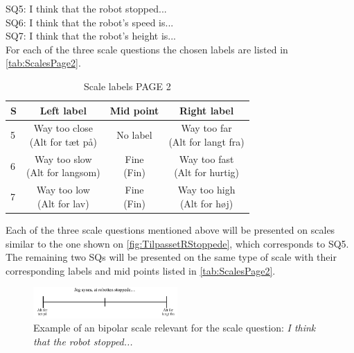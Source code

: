 \noindent
% 
SQ5: I think that the robot stopped... \\%
SQ6: I think that the robot's speed is... \\%
SQ7: I think that the robot's height is... \\%
For each of the three scale questions the chosen labels are listed in \autoref{tab:ScalesPage2}.  
%
\begin{table}[H]
	\centering
\caption{Scale labels PAGE 2}
	\label{tab:ScalesPage2} 
	\begin{tabular}{l|c|c|c}
		S     & Left label & Mid point & Right label \\\hline
		5   & \makecell{Way too close\\(Alt for tæt på)}  & No label & \makecell{Way too far \\(Alt for langt fra)}        \\\hline
		6   & \makecell{Way too slow\\(Alt for langsom)} & \makecell{Fine\\(Fin)} & \makecell{Way too fast \\(Alt for hurtig)}         \\\hline
		7   & \makecell{Way too low \\(Alt for lav)} & \makecell{Fine\\(Fin)} & \makecell{Way too high\\(Alt for høj)}                
	\end{tabular}        
\end{table}
\noindent
%
Each of the three scale questions mentioned above will be presented on scales similar to the one shown on \autoref{fig:TilpassetRStoppede}, which corresponds to SQ5. The remaining two SQs will be presented on the same type of scale with their corresponding labels and mid points listed in \autoref{tab:ScalesPage2}.  
%
\begin{figure}[H]
\centering
\includegraphics[width = 0.49\textwidth]{Figure/TilpassetRStoppede}
\setlength{} 
\caption{Example of an bipolar scale relevant for the scale question: \textit{I think that the robot stopped...}}
\label{fig:TilpassetRStoppede}
\end{figure}
